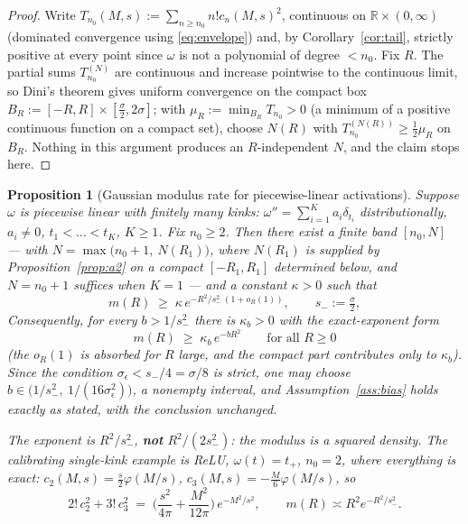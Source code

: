 \documentclass[11pt]{article}
\newtheorem{proposition}{Proposition}
\theoremstyle{remark}
\newcommand{\R}{\mathbb{R}}
\begin{document}
\begin{proof}
Write $T_{n_0}(M,s) := \sum_{n\ge n_0} n!c_n(M,s)^2$, continuous on $\R\times(0,\infty)$ (dominated convergence using \eqref{eq:envelope}) and, by Corollary~\ref{cor:tail}, strictly positive at every point since $\omega$ is not a polynomial of degree $< n_0$. Fix $R$. The partial sums $T^{(N)}_{n_0}$ are continuous and increase pointwise to the continuous limit, so Dini's theorem gives uniform convergence on the compact box $B_R := [-R,R]\times[\tfrac\sigma2,2\sigma]$; with $\mu_R := \min_{B_R} T_{n_0} > 0$ (a minimum of a positive continuous function on a compact set), choose $N(R)$ with $T^{(N(R))}_{n_0} \ge \tfrac12\mu_R$ on $B_R$. Nothing in this argument produces an $R$-independent $N$, and the claim stops here.
\end{proof}

\begin{proposition}[Gaussian modulus rate for piecewise-linear activations]\label{prop:a2b}
Suppose $\omega$ is piecewise linear with finitely many kinks: $\omega'' = \sum_{i=1}^{K} a_i\delta_{t_i}$ distributionally, $a_i \ne 0$, $t_1 < \dots < t_K$, $K \ge 1$. Fix $n_0 \ge 2$. Then there exist a finite band $[n_0, N]$ --- with $N = \max\big(n_0+1,\ N(R_1)\big)$, where $N(R_1)$ is supplied by Proposition~\ref{prop:a2} on a compact $[-R_1, R_1]$ determined below, and $N = n_0 + 1$ suffices when $K = 1$ --- and a constant $\kappa > 0$ such that
\[
m(R) \;\ge\; \kappa\, e^{-R^2/s_-^2\,(1 + o_R(1))}, \qquad s_- := \tfrac\sigma2 ,
\]
Consequently, for \emph{every} $b > 1/s_-^2$ there is $\kappa_b > 0$ with the exact-exponent form
\[
m(R) \;\ge\; \kappa_b\, e^{-bR^2} \qquad \text{for all } R \ge 0
\]
(the $o_R(1)$ is absorbed for $R$ large, and the compact part contributes only to $\kappa_b$). Since the condition $\sigma_\epsilon < s_-/4 = \sigma/8$ is \emph{strict}, one may choose $b \in \big(1/s_-^2,\ 1/(16\sigma_\epsilon^2)\big)$, a nonempty interval, and Assumption~\ref{ass:bias} holds exactly as stated, with the conclusion unchanged.

The exponent is $R^2/s_-^2$, \textbf{not} $R^2/(2s_-^2)$: the modulus is a \emph{squared} density. The calibrating single-kink example is ReLU, $\omega(t) = t_+$, $n_0 = 2$, where everything is exact: $c_2(M,s) = \tfrac{s}{2}\varphi(M/s)$, $c_3(M,s) = -\tfrac{M}{6}\varphi(M/s)$, so
\[
2!\,c_2^2 + 3!\,c_3^2 \;=\; \Big(\frac{s^2}{4\pi} + \frac{M^2}{12\pi}\Big)\,e^{-M^2/s^2},
\qquad
m(R) \asymp R^2 e^{-R^2/s_-^2}.
\]
\end{proposition}
\end{document}
